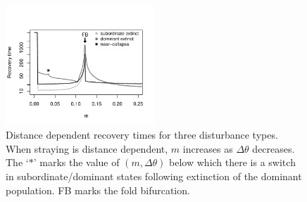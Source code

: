 \documentclass[twocolumn,preprintnumbers,amsmath,amssymb,superscriptaddress]{revtex4}
\begin{document}



\begin{figure}
  \captionsetup{justification=raggedright,
singlelinecheck=false
}
  \centering
  \includegraphics[width=0.5\textwidth]{figs2/fig_mtheta_rt.pdf}
  \caption{
  Distance dependent recovery times for three disturbance types. When straying is distance dependent, $m$ increases as $\Delta\theta$ decreases.
  The `$*$' marks the value of $(m,\Delta\theta)$ below which there is a switch in subordinate/dominant states following extinction of the dominant population.
  FB marks the fold bifurcation.
  } \label{fig:mtheta}
\end{figure}
\end{document}

